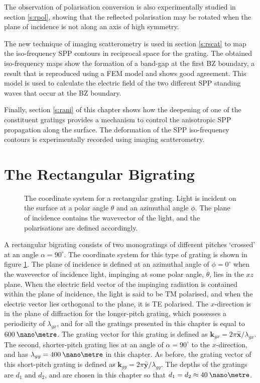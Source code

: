 The observation of polarisation conversion is also experimentally studied in section \ref{s:rpol}, showing that the reflected polarisation may be rotated when the plane of incidence is not along an axis of high symmetry.

The new technique of imaging scatterometry is used in section \ref{s:rscat} to map the iso-frequency SPP contours in reciprocal space for the grating. The obtained iso-frequency maps show the formation of a band-gap at the first BZ boundary, a result that is reproduced using a FEM model and shows good agreement. This model is used to calculate the electric field of the two different SPP standing waves that occur at the BZ boundary.

Finally, section \ref{s:rani} of this chapter shows how the deepening of one of the constituent gratings provides a mechanism to control the  anisotropic SPP propagation along the surface. The deformation of the SPP iso-frequency contours is experimentally recorded using imaging scatterometry.

\section{The Rectangular Bigrating}\label{s:rgrating}

\begin{figure}
\begin{center}

\end{center}
\caption[The coordinate system for a rectangular grating.]{The coordinate system for a rectangular grating. Light is incident on the surface at a polar angle $\theta$ and an azimuthal angle $\phi$. The plane of incidence contains the wavevector of the light, and the polarisations are defined accordingly. \label{fig:rectCoordSys}}
\end{figure}

A rectangular bigrating consists of two monogratings of different pitches `crossed' at an angle $\alpha=90^\circ$. The coordinate system for this type of grating is shown in figure \ref{fig:rectCoordSys}. The plane of incidence is defined at an azimuthal angle of $\phi=0^\circ$ when the wavevector of incidence light, impinging at some polar angle, $\theta$, lies in the $xz$ plane. When the electric field vector of the impinging radiation is contained within the plane of incidence, the light is said to be TM polarised, and when the electric vector lies orthogonal to the plane, it is TE polarised. The $x$-direction is in the plane of diffraction for the longer-pitch grating, which possesses a periodicity of $\lambda_{gx}$, and for all the gratings presented in this chapter is equal to $600\:\nano\metre$. The grating vector for this grating is defined as $\mathbf{k}_{gx}=2\pi\hat{\mathbf{x}}/\lambda_{gx}$. The second, shorter-pitch grating lies at an angle of $\alpha=90^\circ$ to the $x$-direction, and has $\lambda_{gy}=400\:\nano\metre$ in this chapter. As before, the grating vector of this short-pitch grating is defined as $\mathbf{k}_{gy}=2\pi\hat{\mathbf{y}}/\lambda_{gy}$. The depths of the gratings are $d_1$ and $d_2$, and are chosen in this chapter so that $d_1 = d_2 \approx 40\:\nano\metre$.

